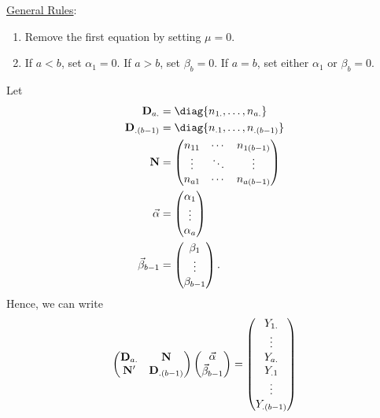 \underline{General Rules}:
\begin{enumerate}[(1)]
    \item Remove the first equation by setting $ \mu=0 $.
    \item If $ a<b $, set $ \alpha_1=0 $. If $ a>b $, set $ \beta_b=0 $. If $ a=b $, set either $ \alpha_1 $ or $ \beta_b=0 $.
\end{enumerate}
Let
\begin{align*}
    \Matrix{D}_{a.}      & =\diag{n_{1.},\ldots,n_{a.}}     \\
    \Matrix{D}_{.(b-1)}  & =\diag{n_{.1},\ldots,n_{.(b-1)}} \\
    \Matrix{N}           & =\begin{pmatrix}
                                n_{11} & \cdots & n_{1(b-1)} \\
                                \vdots & \ddots & \vdots     \\
                                n_{a1} & \cdots & n_{a(b-1)}
                            \end{pmatrix}    \\
    \Vector{\alpha}      & =\begin{pmatrix}
                                \alpha_1 \\
                                \vdots   \\
                                \alpha_a
                            \end{pmatrix}                  \\
    \Vector{\beta}_{b-1} & =\begin{pmatrix}
                                \beta_1 \\
                                \vdots  \\
                                \beta_{b-1}
                            \end{pmatrix}.
\end{align*}
Hence, we can write
\[ \begin{pmatrix}
        \mathbf{D}_{a.} & \mathbf{N}          \\
        \mathbf{N}'     & \mathbf{D}_{.(b-1)}
    \end{pmatrix}\begin{pmatrix}
        \vec{\alpha} \\
        \vec{\beta}_{b-1}
    \end{pmatrix}=\begin{pmatrix}
        Y_{1.} \\
        \vdots \\
        Y_{a.} \\
        Y_{.1} \\
        \vdots \\
        Y_{.(b-1)}
    \end{pmatrix} \]
